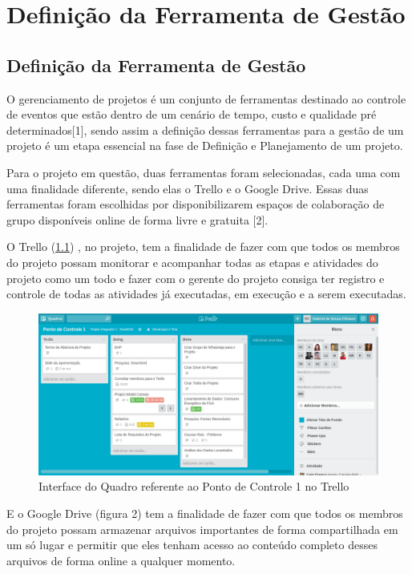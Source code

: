 \part{Definição da Ferramenta de Gestão}
\chapter[Definição da Ferramenta de Gestão]{Definição da Ferramenta de Gestão}

O gerenciamento de projetos é um conjunto de ferramentas destinado ao controle de eventos que estão dentro de um cenário de tempo, custo e qualidade pré determinados[1], sendo assim a definição dessas ferramentas para a gestão de um projeto é um etapa essencial na fase de Definição e Planejamento de um projeto.  

Para o projeto em questão, duas ferramentas foram selecionadas, cada uma com uma finalidade diferente, sendo elas o Trello e o Google Drive. Essas duas ferramentas foram escolhidas por disponibilizarem espaços de colaboração de grupo disponíveis online de forma livre e gratuita [2]. 

O Trello (\ref{fig:trello}) , no projeto, tem a finalidade de fazer com que todos os membros do projeto possam monitorar e acompanhar todas as etapas e atividades do projeto como um todo e fazer com o gerente do projeto consiga ter registro e controle de todas as atividades já executadas, em execução e a serem executadas.

\begin{figure}[!h]
	\centering
	\includegraphics[scale=.7]{figuras/trello.png}
	\caption{Interface do Quadro referente ao Ponto de Controle 1 no Trello}
	\label{fig:trello}
\end{figure}

E o Google Drive (figura 2) tem a finalidade de fazer com que todos os membros do projeto possam armazenar arquivos importantes de forma compartilhada em um só lugar e permitir que eles tenham acesso ao conteúdo completo desses arquivos de forma online a qualquer momento.

